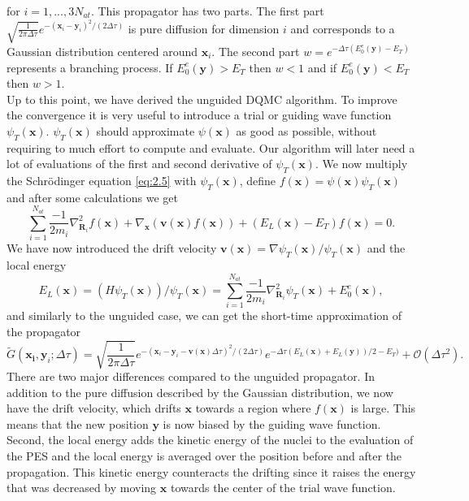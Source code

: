 \documentclass [12pt]{report}
\begin{document}
for $i=1,...,3N_{at}$. This propagator has two parts. The first part $\sqrt{\frac{1}{2 \pi \Delta \tau}} e^{-(\bm{x}_i-\bm{y}_i)^2/(2\Delta \tau)}$ is pure diffusion for dimension $i$ and corresponds to a Gaussian distribution centered around $\bm{x}_i$. The second part $w = e^{-\Delta \tau (E_0^e(\bm{y}) - E_T)}$ represents a branching process. If $E_0^e(\bm{y}) > E_T$ then $w < 1$ and if $E_0^e(\bm{y}) < E_T$ then $w > 1$.\\
Up to this point, we have derived the unguided DQMC algorithm. To improve the convergence it is very useful to introduce a trial or guiding wave function $\psi_T(\bm{x})$. $\psi_T(\bm{x})$ should approximate $\psi(\bm{x})$ as good as possible, without requiring to much effort to compute and evaluate. Our algorithm will later need a lot of evaluations of the first and second derivative of $\psi_T(\bm{x})$. We now multiply the Schrödinger equation \eqref{eq:2.5} with $\psi_T(\bm{x})$, define $f(\bm{x}) = \psi(\bm{x}) \psi_T(\bm{x})$ and after some calculations \cite{cyrus2} we get
\begin{equation} \label{eq:2.8}
\sum_{i=1}^{N_{at}} \frac{-1}{2m_i} \nabla^2_{\bm{R}_i} f(\bm{x}) + \nabla_{\bm{x}} (\bm{v}(\bm{x}) f(\bm{x})) + (E_L(\bm{x}) - E_T)f(\bm{x}) = 0.
\end{equation}
We have now introduced the drift velocity $\bm{v}(\bm{x}) = \nabla \psi_T(\bm{x})/ \psi_T(\bm{x})$ and the local energy 
\begin{equation}\label{el}
E_L(\bm{x}) = (H\psi_T(\bm{x}))/\psi_T(\bm{x}) = \sum_{i=1}^{N_{at}} \frac{-1}{2m_i} \nabla^2_{\bm{R}_i} \psi_T(\bm{x}) + E_0^e(\bm{x}),
\end{equation}
and similarly to the unguided case, we can get the short-time approximation of the propagator
\begin{equation} \label{eq:2.9}
\tilde{G}(\bm{x_i},\bm{y}_i;\Delta \tau) = \sqrt{\frac{1}{2 \pi \Delta \tau}} e^{-(\bm{x}_i-\bm{y}_i-\bm{v}(\bm{x})\Delta \tau)^2 /(2 \Delta \tau)} e^{-\Delta \tau (E_L(\bm{x})+E_L(\bm{y}))/2 - E_T)} + \mathcal{O}(\Delta \tau^2).
\end{equation}
There are two major differences compared to the unguided propagator. In addition to the pure diffusion described by the Gaussian distribution, we now have the drift velocity, which drifts $\bm{x}$ towards a region where $f(\bm{x})$ is large. This means that the new position $\bm{y}$ is now biased by the guiding wave function. Second, the local energy adds the kinetic energy of the nuclei to the evaluation of the PES and the local energy is averaged over the position before and after the propagation. This kinetic energy counteracts the drifting since it raises the energy that was decreased by moving $\bm{x}$ towards the center of the trial wave function.
\end{document}
